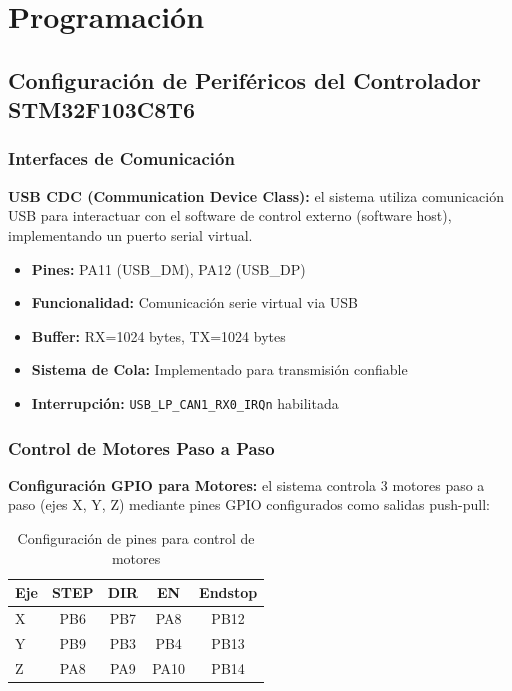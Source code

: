\documentclass[12pt]{article}
\begin{document}

\section{Programación}

\subsection{Configuración de Periféricos del Controlador STM32F103C8T6}

\subsubsection{Interfaces de Comunicación}

\textbf{USB CDC (Communication Device Class):} el sistema utiliza comunicación USB para interactuar con el software de control externo (software host), implementando un puerto serial virtual.

\begin{itemize}
    \item \textbf{Pines:} PA11 (USB\_DM), PA12 (USB\_DP)
    \item \textbf{Funcionalidad:} Comunicación serie virtual via USB
    \item \textbf{Buffer:} RX=1024 bytes, TX=1024 bytes
    \item \textbf{Sistema de Cola:} Implementado para transmisión confiable
    \item \textbf{Interrupción:} \texttt{USB\_LP\_CAN1\_RX0\_IRQn} habilitada
\end{itemize}

\subsubsection{Control de Motores Paso a Paso}

\textbf{Configuración GPIO para Motores:} el sistema controla 3 motores paso a paso (ejes X, Y, Z) mediante pines GPIO configurados como salidas push-pull:

\begin{table}[h]
\centering
\begin{tabular}{|l|c|c|c|c|}
\hline
\textbf{Eje} & \textbf{STEP} & \textbf{DIR} & \textbf{EN} & \textbf{Endstop} \\
\hline
X & PB6 & PB7 & PA8 & PB12 \\
Y & PB9 & PB3 & PB4 & PB13 \\
Z & PA8 & PA9 & PA10 & PB14 \\
\hline
\end{tabular}
\caption{Configuración de pines para control de motores}
\end{table}
\end{document}
